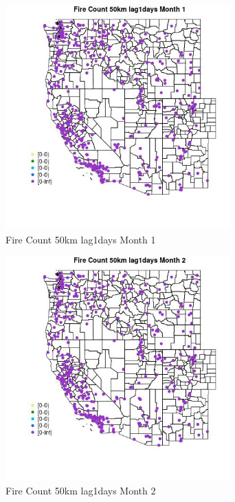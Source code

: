\begin{figure} 
\centering  
\includegraphics[width=0.77\textwidth]{Code_Outputs/Report_ML_input_PM25_Step4_part_e_de_duplicated_aves_compiled_2019-05-18wNAs_MapObsMo1Fire_Count_50km_lag1days.jpg} 
\caption{\label{fig:Report_ML_input_PM25_Step4_part_e_de_duplicated_aves_compiled_2019-05-18wNAsMapObsMo1Fire_Count_50km_lag1days}Fire Count 50km lag1days Month 1} 
\end{figure} 
 

\clearpage 

\begin{figure} 
\centering  
\includegraphics[width=0.77\textwidth]{Code_Outputs/Report_ML_input_PM25_Step4_part_e_de_duplicated_aves_compiled_2019-05-18wNAs_MapObsMo2Fire_Count_50km_lag1days.jpg} 
\caption{\label{fig:Report_ML_input_PM25_Step4_part_e_de_duplicated_aves_compiled_2019-05-18wNAsMapObsMo2Fire_Count_50km_lag1days}Fire Count 50km lag1days Month 2} 
\end{figure} 
 

